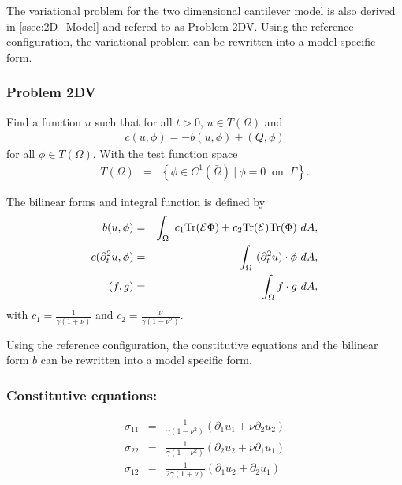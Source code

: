 \FloatBarrier

The variational problem for the two dimensional cantilever model is also derived in \ref{ssec:2D_Model} and refered to as Problem 2DV. Using the reference configuration, the variational problem can be rewritten into a model specific form.

\subsubsection{Problem 2DV}\label{sssec:2D_Model:Problem2D1VChp5}
Find a function $u$ such that for all $t>0$, $u \in T(\Omega)$ and 
\begin{align}
	c(u,\phi) = -b(u,\phi) + (Q,\phi) \label{eq:2D_Model:Problem2D1VEqChp5}
\end{align}
for all $\phi \in T(\Omega)$. With the test function space 
\begin{eqnarray*}
	T(\Omega) & = & \left\{ \phi \in C^1(\bar{\Omega}) \ | \ \phi = 0 \ \textrm{ on } \ \Gamma \right\}.
\end{eqnarray*}

The bilinear forms and integral function is defined by
\begin{eqnarray}
	b(u,\phi) & = & \int_\Omega~c_1\textrm{Tr}({\cal E}\Phi)+ c_2\textrm{Tr}({\cal E})
	\textrm{Tr}(\Phi) ~dA, \label{eq:2D_Model:BilinearChp5}\\
	c(\partial_t^2 u,\phi) & = & \int_\Omega~ (\partial^2_t u) \cdot \phi~dA, \label{eq:2D_Model:Bilinear_cChp5}\\
	(f,g) &=& \int_{\Omega} f\cdot g \ dA, \label{eq:2D_Model:Bilinear_intChp5}
\end{eqnarray}
with $\displaystyle c_1 = \frac{1}{\gamma(1+\nu)}$ and $\displaystyle c_2 = \frac{\nu}{\gamma(1-\nu^2)}$.

Using the reference configuration, the constitutive equations and the bilinear form $b$ can be rewritten into a model specific form.

\subsubsection{Constitutive equations:}
\begin{eqnarray}
	\sigma_{11} & = & \frac{1}{\gamma(1-\nu^2)}(\partial_1 u_1 + \nu \partial_2 u_2) \label{CE1} \\
	\sigma_{22} & = & \frac{1}{\gamma(1-\nu^2)}(\partial_2 u_2 + \nu \partial_1 u_1) \label{CE2} \\
	\sigma_{12} & = & \frac{1}{2\gamma(1+\nu)}(\partial_1 u_2 + \partial_2 u_1) \label{CE3}
\end{eqnarray}

